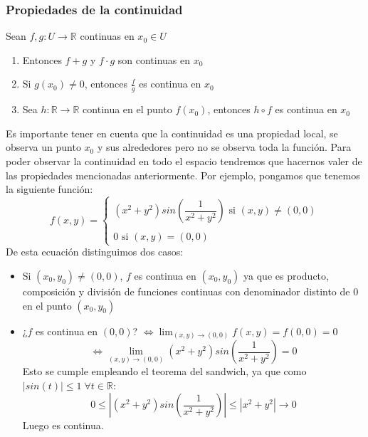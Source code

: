\documentclass[11pt]{article}
\providecommand{\abs}[1]{\left\lvert #1\right\rvert}
\providecommand{\abs}[1]{\left\lvert #1\right\rvert}
\newcommand{\R}{\mathbb{R}}
\theoremstyle{plain}
\begin{document}
            \subsubsection{Propiedades de la continuidad} %
            \label{subsub:propiedades_de_la_continuidad}
                Sean $f,g: U \rightarrow \R$ continuas en $x_0 \in U$
                \begin{enumerate}[label = \Alph*]
                    \item Entonces $f+g$ y $f \cdot g$ son continuas en $x_0$
                    \item Si $g(x_0) \ne 0$, entonces $\frac {f}{g}$ es continua en $x_0$
                    \item Sea $h:\R\rightarrow\R$ continua en el punto $f(x_0)$, entonces $h \circ f$ es continua en $x_0$
                \end{enumerate}
                Es importante tener en cuenta que la continuidad es una propiedad local, se observa un punto $x_0$ y sus alrededores pero no se observa toda la función. Para poder observar la continuidad en todo el espacio tendremos que hacernos valer de las propiedades mencionadas anteriormente. Por ejemplo, pongamos que tenemos la siguiente función:
                \begin{equation}
                    f(x,y) = 
                    \begin{cases}
                        (x^2 + y^2)sin(\dfrac{1}{x^2+y^2}) \text{ si } (x,y)\ne(0,0)\\ \\ 0 \text{ si } (x,y) = (0,0)
                    \end{cases}
                \end{equation}
                De esta ecuación distinguimos dos casos:
                \begin{itemize}
                    \item Si $(x_0,y_0) \ne (0,0)$, $f$ es continua en $(x_0,y_0)$ ya que es producto, composición y división de funciones continuas con denominador distinto de 0 en el punto $(x_0,y_0)$
                    \item ¿$f$ es continua en $(0,0)$? $\Leftrightarrow \lim_{(x,y)\to(0,0)} f(x,y) = f(0,0) = 0$
                    \[\Leftrightarrow \lim_{(x,y)\to(0,0)} (x^2 + y^2)sin(\frac{1}{x^2 + y^2}) = 0 \]
                    Esto se cumple empleando el teorema del sandwich, ya que como $\abs{sin(t)} \le 1 \; \forall t\in\R$:
                    \[0 \le \abs{(x^2+y^2)sin(\frac{1}{x^2+y^2})}\le \abs{x^2 + y^2} \rightarrow 0\]
                    Luego es continua.
                \end{itemize}
\end{document}
